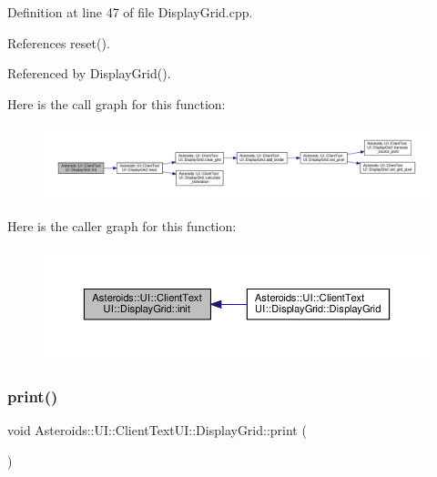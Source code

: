 Definition at line 47 of file Display\+Grid.\+cpp.



References reset().



Referenced by Display\+Grid().

Here is the call graph for this function\+:\nopagebreak
\begin{figure}[H]
\begin{center}
\leavevmode
\includegraphics[width=350pt]{classAsteroids_1_1UI_1_1ClientTextUI_1_1DisplayGrid_a56b4a0b5f6d69ac13c3c7212db3e77b0_cgraph}
\end{center}
\end{figure}
Here is the caller graph for this function\+:\nopagebreak
\begin{figure}[H]
\begin{center}
\leavevmode
\includegraphics[width=350pt]{classAsteroids_1_1UI_1_1ClientTextUI_1_1DisplayGrid_a56b4a0b5f6d69ac13c3c7212db3e77b0_icgraph}
\end{center}
\end{figure}
\mbox{\label{classAsteroids_1_1UI_1_1ClientTextUI_1_1DisplayGrid_a1be310d6b569c5abee1299a1a50ce7cb}} 
\subsubsection{\texorpdfstring{print()}{print()}}
{\footnotesize\ttfamily void Asteroids\+::\+U\+I\+::\+Client\+Text\+U\+I\+::\+Display\+Grid\+::print (\begin{DoxyParamCaption}{ }\end{DoxyParamCaption})}



